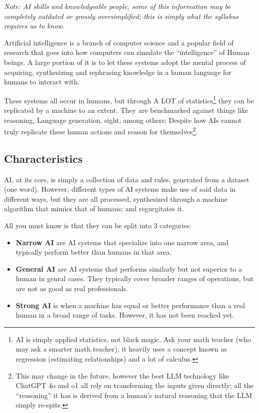 \documentclass[../main.tex]{subfiles}
\begin{document}
\emph{Note: AI shills and knowledgeable people, some of this information may be completely outdated or grossly oversimplified; this is simply what the syllabus requires us to know.}

Artificial intelligence is a branch of computer science and a popular field of research that goes into how computers can simulate the “intelligence” of Human beings. A large portion of it is to let these systems adopt the mental process of acquiring, synthesizing and rephrasing knowledge in a human language for humans to interact with.

These systems all occur in humans, but through A LOT of statistics\footnote{AI is simply applied statistics, not black magic. Ask your math teacher (who may ask a smarter math teacher), it heavily uses a concept known as regression (estimating relationships) and a lot of calculus.} they can be replicated by a machine to an extent. They are benchmarked against things like reasoning, Language generation, sight, among others; Despite how AIs cannot truly replicate these human actions and reason for themselves\footnote{This may change in the future, however the best LLM technology like ChatGPT 4o and o1 all rely on transforming the inputs given directly; all the “reasoning” it has is derived from a human’s natural reasoning that the LLM simply re-spits.}.

\subsection{Characteristics}

AI, at its core, is simply a collection of data and rules, generated from a dataset (one word). However, different types of AI systems make use of said data in different ways, but they are all processed, synthesized through a machine algorithm that mimics that of humans; and regurgitates it.

All you must know is that they can be split into 3 categories:

\begin{itemize}
    \item \textbf{Narrow AI} are AI systems that specialize into one narrow area, and typically perform better than humans in that area.
    \item \textbf{General AI} are AI systems that performs similarly but not superior to a human in genral cases. They typically cover broader ranges of operations, but are not as good as real professionals.
    \item \textbf{Strong AI} is when a machine has equal or better performance than a real human in a broad range of tasks. However, it has not been reached yet.
\end{itemize}
\end{document}

